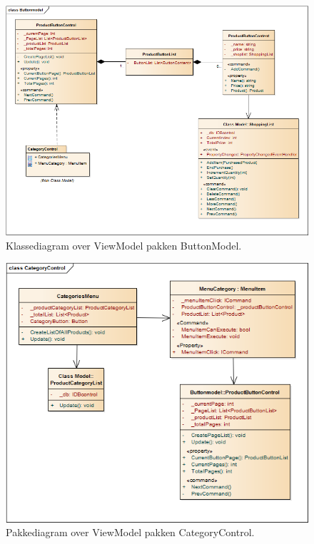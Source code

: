 \begin{figure}[H]
	\centering
	\includegraphics[width=1\textwidth]{Systemdesign/Frontend/GUI/DesignOgStruktur/Pics/KlassediagramButtonModel}
	\caption{Klassediagram over ViewModel pakken ButtonModel.}
	\label{fig:EndeligeGUI}
\end{figure}

\begin{figure}[H]
	\centering
	\includegraphics[width=1\textwidth]{Systemdesign/Frontend/GUI/DesignOgStruktur/Pics/KlassediagramCategoryControl}
	\caption{Pakkediagram over ViewModel pakken CategoryControl.}
	\label{fig:EndeligeGUI}
\end{figure}